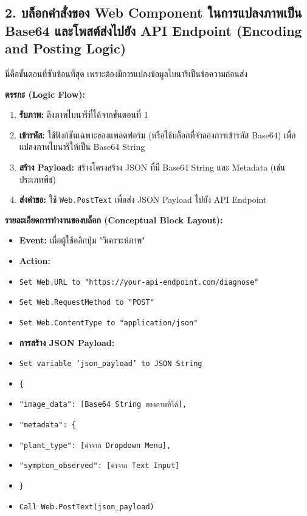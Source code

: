 \documentclass[11pt,a4paper,openany]{report}
\begin{document}
\subsection{2. บล็อกคำสั่งของ Web Component ในการแปลงภาพเป็น Base64 และโพสต์ส่งไปยัง API Endpoint (Encoding and Posting Logic)}


นี่คือขั้นตอนที่ซับซ้อนที่สุด เพราะต้องมีการแปลงข้อมูลไบนารีเป็นข้อความก่อนส่ง

\textbf{ตรรกะ (Logic Flow):}
\begin{enumerate}
  \item \textbf{รับภาพ:} ดึงภาพไบนารีที่ได้จากขั้นตอนที่ 1
  \item \textbf{เข้ารหัส:} ใช้ฟังก์ชันเฉพาะของแพลตฟอร์ม (หรือใช้บล็อกที่จำลองการเข้ารหัส Base64) เพื่อแปลงภาพไบนารีให้เป็น Base64 String
  \item \textbf{สร้าง Payload:} สร้างโครงสร้าง JSON ที่มี Base64 String และ Metadata (เช่น ประเภทพืช)
  \item \textbf{ส่งคำขอ:} ใช้ \texttt{Web.PostText} เพื่อส่ง JSON Payload ไปยัง API Endpoint
\end{enumerate}


\textbf{รายละเอียดการทำงานของบล็อก (Conceptual Block Layout):}

\begin{itemize}
  \item \textbf{Event:} เมื่อผู้ใช้คลิกปุ่ม "วิเคราะห์ภาพ"
  \item \textbf{Action:}
  \item \texttt{Set Web.URL to "https://your-api-endpoint.com/diagnose"}
  \item \texttt{Set Web.RequestMethod to "POST"}
  \item \texttt{Set Web.ContentType to "application/json"}
  \item \textbf{การสร้าง JSON Payload:}
  \item \texttt{Set variable 'json\_payload' to JSON String}
  \item \texttt{\{}
  \item \texttt{"image\_data": [Base64 String ของภาพที่ได้],}
  \item \texttt{"metadata": \{}
  \item \texttt{"plant\_type": [ค่าจาก Dropdown Menu],}
  \item \texttt{"symptom\_observed": [ค่าจาก Text Input]}
  \item \texttt{\}}
  \item \texttt{Call Web.PostText(json\_payload)}
\end{itemize}
\end{document}
